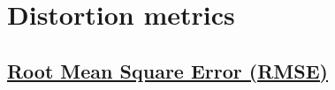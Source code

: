 \documentclass{article}
\begin{document}






\section{Distortion metrics}

\subsection{\href{https://en.wikipedia.org/wiki/Root_mean_square_deviation}{Root Mean
    Square Error (RMSE)}}
\end{document}
